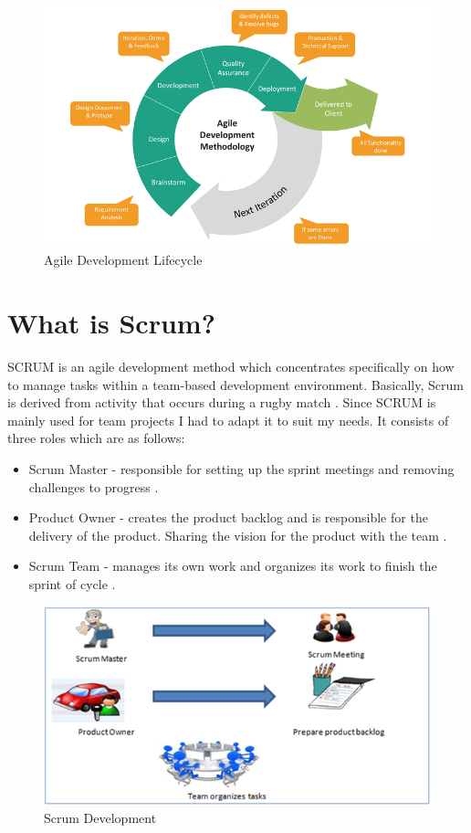 \begin{figure}[h]
\centering
\includegraphics[scale=0.4]{img/agile-development-chart.png}
\caption{Agile Development Lifecycle}
\label{Agile}
\end{figure}


\newpage

\section{What is Scrum?}
SCRUM is an agile development method which concentrates specifically on how to manage tasks within a team-based development environment. Basically, Scrum is derived from activity that occurs during a rugby match \cite{Agile}. Since SCRUM is mainly used for team projects I had to adapt it to suit my needs. It consists of three roles which are as follows:

\begin{itemize}
    \item Scrum Master - responsible for setting up the sprint meetings and removing challenges to progress \cite{Agile}.
    \item Product Owner -  creates the product backlog and is responsible for the delivery of the product. Sharing the vision for the product with the team \cite{Agile}.
    \item Scrum Team - manages its own work and organizes its work to finish the sprint of cycle \cite{Agile}.
\end{itemize}

\begin{figure}[h]
\centering
\includegraphics[scale=0.4]{img/scrum.png}
\caption{Scrum Development}
\label{Scrum}
\end{figure}


